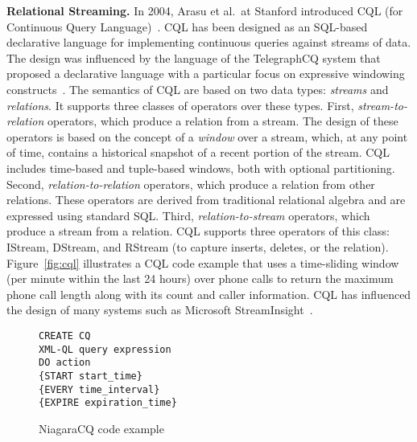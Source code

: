 \textbf{Relational Streaming.}
In 2004, Arasu et al.\ at Stanford introduced CQL (for Continuous
Query Language)~\cite{arasu_widom_2004}. CQL has been designed as an
SQL-based declarative language for implementing continuous queries
against streams of data. The design was influenced by the language of
the TelegraphCQ system that proposed a declarative language with a
particular focus on expressive windowing
constructs~\cite{chandrasekaran_et_al_2003}. The semantics of CQL are
based on two data types: \emph{streams} and \emph{relations}. It
supports three classes of operators over these types. First,
\emph{stream-to-relation} operators, which produce a relation from a
stream.  The design of these operators is based on the concept of a
\emph{window} over a stream, which, at any point of time, contains a
historical snapshot of a recent portion of the stream. CQL includes
time-based and tuple-based windows, both with optional
partitioning. Second, \emph{relation-to-relation} operators, which
produce a relation from other relations. These operators are derived
from traditional relational algebra and are expressed using standard
SQL. Third, \emph{relation-to-stream} operators, which produce a
stream from a relation. CQL supports three operators of this class:
IStream, DStream, and RStream (to capture inserts, deletes, or the
relation).  Figure~\ref{fig:cql} illustrates a CQL code example that
uses a time-sliding window (per minute within the last 24 hours) over
phone calls to return the maximum phone call length along with its
count and caller information. CQL has influenced the design of many
systems such as Microsoft StreamInsight~\cite{ali_et_al_2009}.

\begin{figure}
\begin{lstlisting}
CREATE CQ
XML-QL query expression
DO action
{START start_time} 
{EVERY time_interval} 
{EXPIRE expiration_time}
\end{lstlisting}
\caption{\label{fig:Niagra}NiagaraCQ code example}
\end{figure}

